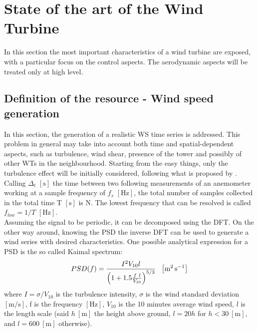 \newpage
\section{State of the art of the Wind Turbine}\label{sec:c_WT_characteristics}
In this section the most important characteristics of a wind turbine are exposed, with a particular focus on the control aspects. The aerodynamic aspects will be treated only at high level. 

\subsection{Definition of the resource - Wind speed generation}
In this section, the generation of a realistic \acrshort{WS} time series is addressed. This problem in general may take into account both time and spatial-dependent aspects, such as turbulence, wind shear, presence of the tower and possibly of other WTs in the neighbourhood. Starting from the easy things, only the turbulence effect will be initially considered, following what is proposed by \cite{Aerodynamics_of_wind_turbines}. \\
Calling $\Delta_t$ $\left[\si{\second}\right]$ the time between two following measurements of an anemometer working at a sample frequency of $f_s$ $\left[\si{\hertz}\right]$, the total number of samples collected in the total time T $\left[\si{\second}\right]$ is N. The lowest frequency that can be resolved is called $f_{low}=1/T$ $\left[\si{\hertz}\right]$. \\
Assuming the signal to be periodic, it can be decomposed using the \acrfull{DFT}. On the other way around, knowing the \acrfull{PSD} the inverse \acrshort{DFT} can be used to generate a wind series with desired characteristics. One possible analytical expression for a \acrshort{PSD} is the so called Kaimal spectrum:
\begin{equation}
    PSD(f) = \frac{I^2V_{10}l}{\left(1+1.5\frac{f \ l}{V_{10}}\right)^{5/3}} \ \ \mesunt{\square \meter \per \second}
    \label{eq:PSD}
\end{equation}
where $I=\sigma/V_{10}$ is the turbulence intensity, $\sigma$ is the wind standard deviation $\left[\si{\meter\per\second}\right]$, f is the frequency $\left[\si{\hertz}\right]$, $V_{10}$ is the 10 minutes average wind speed, $l$ is the length scale (said $h \ \left[\si{\meter}\right]$ the height above ground, $l=20h$ for $h<30 \ \left[\si{\meter}\right]$, and  $l=600 \ \left[\si{\meter}\right]$ otherwise).\\
